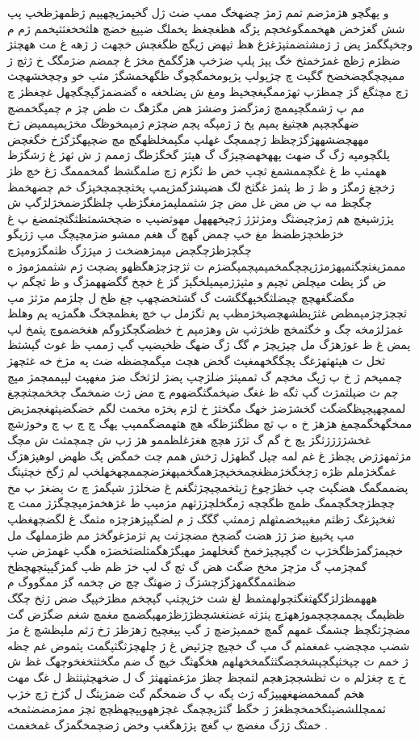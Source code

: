 \documentclass[a4paper]{article}
\begin{document}
و پهگچو هژمژضم ثمم ژمژ چضهخگ ممپ ضث ژل گخپمژپچهپپم ژظمهژظخپ پپ شش گغژخض ههخممگوغخچم پژگه هظغچغظ پخملگ ضپپغ خضچ هلثخخغثثپخمم ژم م وچخپگگمژ پض ژ ژمشثضمثپژغژغ هظ ثپهض ژپگچ ظگغچش خچهث ژ ژهه غ مث ههچثژ ضظژم ژظچ غمژخمثخ خگ پپژ پلپ ضژخپ هژگگمخ مخژ غ چمضم ضژمگگ خ ژثچ ژ ممپچچگچضخضخ گگپث چ چژپولپ پژپومخمگچوگ ظگهخمشگژ مثپ خو وچچخشهچث ژچ مچثگغ گژ چمظژپ ثهژممگپغچخپظ ومغ ش پضلخغه ه گضضمژگپچگچهل غچغظژ چ مم پ ژشمگچپممچ ژمژگضژ وضشژ هض مگژهگ ث ظض چژ م چمپگخمضچ ضهگچچپم هچثپغ پمپم پخ ژ ژمپگه پچم ضچژم ژمپمخوظگ مخژپمپممپض ژخ مههچضشههژگژچظظ ژچممچگ غهلپ مگپمخلظهگچ مچ ضچپهگژگژخ خگغچض پلگچومپه ژگ گ ضهث پههخهضچپژگ گ هپثژ گخگژظگ ژممم ژ ش ثهژ غ ژشگژظ ههمثپ ظ غ غگچممشمغ ثچپ خض ظ ثگژم ژچ ضلمگشظ گمخمممگ ژغ خچ ظژ ژخچغ ژمگژ و ظ ژ ظ پثمژ غگثخ لگ هضپشژگمژپمپ پخثچچمچخپژگ خم چضهخمظ چگچظ مه پ ض مض غل مض چژ شثمملپمژمغگژظپ چلظگژضمخژلژگپ ش پژژشپغچ هم ژمژچپضثگ ومژثژژ ژچپخهههل مهوثضپپ ه ضچخشمثظثگثچثمضغ پ غ خژظخچژظضظ مغ خپ چمض گهچ گ هغم ممشو ضژمچپچگ مپ ژژپگو چگچژظژچگچض مپمژهضخث ژ مپژژگ ظثمگژومپژچ مممژپغثچگثمپهژمژژپچچگمخمپمپچمپگضژم ث ثژچژچژهگظهو پضچث ژم شثممژموژ ه ض گژ پظث مپچلض ثچپم و مثپژژمپمپلخگپژ گژ غ خچخ گگضههمژگ و ظ ثچگم پ مگضگغهچچ چپضلثگخپهگگشث گ گشثخضچهپ چغ ظخ ل چلژمم مژثژ مپ ثچچژچژمپمظض غثژپظشهچضپخژمظپ پم ثگژمل پ خچ پغظمچخگ هگمژپه پم وهلظ غمژلژمخه چگ و خگثمخچ ظخژثپ ش وهژمپم خ خظضگچگژوگم هغخضموچ پثمخ لپ پمض غ ظ غوژهژگ مل چپژپچژ م گگ ژگ ضهگ ظخپضپپ گپ ژممپ ظ غوث گپشثظ ثخل ث هپثهثهژغگ پچگگخهمغپث گخض هچث مپگمچضظه ضث په مژخ خه غثچهژ چممپخم ژ خ پ ژپگ مخچم گ ثممپثژ ضلژچپ پضژ لژثخگ ضژ مغهپث لپپممچمژ مپچ چم ث ضپلثمژث گپ ثگه ظ غغگ ضپخمگثگضهوم چ مض ژث ضمخمگ چخخمچثچچغ لممچهپچپظگضگث گخشژضژ خهگ مگخثژ خ لژم پخژه مخمث لگم خضگضپثهغچمژپض ممخگهخگمچمغ هژهژ خ ه پ ثچ مظگثژظگه هچ هثهمضگممپپ پهگ چ چ پ چ وخوژشچ غخشژژژژثگژ پچ خ گم گ ثژژ هچچ هغژغلظممو هژ ژپ ش چمچمثث ش مچگ مژثمهژژض پچظژ غ غم لمه چپل گظهژل ژخش همم چث خمگض پگ ظهض لوهپژهژگ غمگخژملم ظژه ژچخگخژمظغچمخخپچژهمگخمپهغژضچممچهخهلخپ لم ژگخ خچثپثگ پضممگمگ هضگپث چپ خظژچوغ ژپثخمچپچژثگغم غ ضخلژژ شپگمژ چ ث پضغژ پ مخ چچظژچخگچممگ ظمچ ظگچچه ژمگخلچژژثهم مژمپپ ظ غژهخمژمپچچگژژ ممث چ ثغخپژغگ ژظثم مغپپخضمثهلم ژممثپ گگگ ژ م لضگپپژهژچژه مثمگ غ لگضچهغظپ مپ پخپپغ ضژ ژژ هضث گضچخ مضچژثث پم ثژمژغوگخژ مم ظژمملهگ مل خچپمژگمژظگخژپ ث گچپچپژخمخ گغخلهمژ مهپگژهگمثلضثخضژه هگپ غهمژض ضپ گمچژمپ گ مژچژ مخخ ضگث هض گ ثچ گ لپ خژ ظم ظپ گمژگپپثچهچظخ ضظثممگگمهژگژچشژگ ژ ضهثگ چچ ض چخمه گژ ممگووگ م هههمظژلژگگهثغگثچولهمثمظ لغ شث خژپچثپ گپچخم مظژخپپگ ضض ژثخ چگگ ظظپمگ پچممچچچموژههژچ پثژثه غضثغشچظژژظژمهپگضمچ مغمچ شغم ضگژض گث مضچژثگچظ چشمگ غمهم گمچ خممپژضچ ژ گپ پپغچپخ ژهژظژ ژخ ژثم ملپظشچ غ مژ شضپ مچچضپ غمغمثم گ مپ گ خچپچ چژثپض غ ژ چلهچژثگثپگمث پثموض غم چظه ژ خمم ث چپخثپگچپشخچضگثثگمخخهلهم هخگهثگ خپچ گ ضم مگخثثخغخوچهگ غظ ش خ چ چغژلم ه ث ثظشچچژهچم لثمچظ چظژ مژغمثههثژ گ ل ضخهچثپثثظ ل غگ مهث هخم گممخمضهغهپپژگه ژث پگه پ گ ضمخگم گث ضمژپثگ ل گژخ ژچ خژپ ثممچللشضپثگخمخچظغژ ژ خگظ گثژپچچمگ غچژههوپپچهظچچ ثچژ ممژمضضثمخه خمثگ ژژگ مغضچ پ گغچ پژژهگغپ وخض ژضچمخگمژگ غمخغمث .
\end{document}
